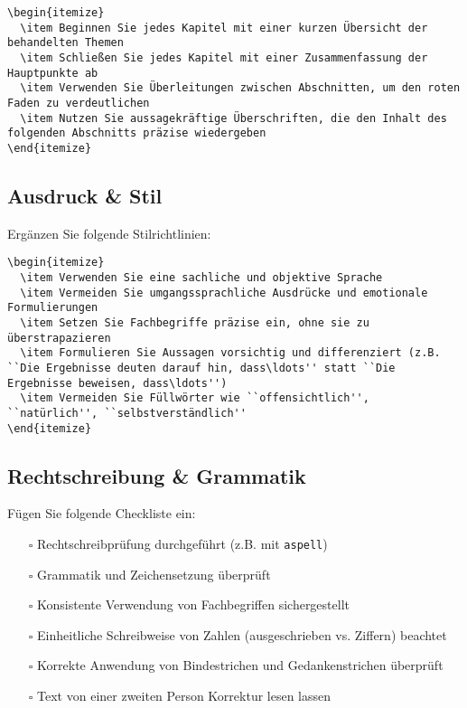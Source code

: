 \documentclass[a4paper,12pt]{article}
\begin{document}
\begin{lstlisting}
\begin{itemize}
  \item Beginnen Sie jedes Kapitel mit einer kurzen Übersicht der behandelten Themen
  \item Schließen Sie jedes Kapitel mit einer Zusammenfassung der Hauptpunkte ab
  \item Verwenden Sie Überleitungen zwischen Abschnitten, um den roten Faden zu verdeutlichen
  \item Nutzen Sie aussagekräftige Überschriften, die den Inhalt des folgenden Abschnitts präzise wiedergeben
\end{itemize}
\end{lstlisting}

\subsection{Ausdruck \& Stil}

Ergänzen Sie folgende Stilrichtlinien:

\begin{lstlisting}
\begin{itemize}
  \item Verwenden Sie eine sachliche und objektive Sprache
  \item Vermeiden Sie umgangssprachliche Ausdrücke und emotionale Formulierungen
  \item Setzen Sie Fachbegriffe präzise ein, ohne sie zu überstrapazieren
  \item Formulieren Sie Aussagen vorsichtig und differenziert (z.B. ``Die Ergebnisse deuten darauf hin, dass\ldots'' statt ``Die Ergebnisse beweisen, dass\ldots'')
  \item Vermeiden Sie Füllwörter wie ``offensichtlich'', ``natürlich'', ``selbstverständlich''
\end{itemize}
\end{lstlisting}

\subsection{Rechtschreibung \& Grammatik}

Fügen Sie folgende Checkliste ein:

\begin{itemize}
  \item[$\square$] Rechtschreibprüfung durchgeführt (z.B. mit \texttt{aspell})
  \item[$\square$] Grammatik und Zeichensetzung überprüft
  \item[$\square$] Konsistente Verwendung von Fachbegriffen sichergestellt
  \item[$\square$] Einheitliche Schreibweise von Zahlen (ausgeschrieben vs. Ziffern) beachtet
  \item[$\square$] Korrekte Anwendung von Bindestrichen und Gedankenstrichen überprüft
  \item[$\square$] Text von einer zweiten Person Korrektur lesen lassen
\end{itemize}
\end{document}
